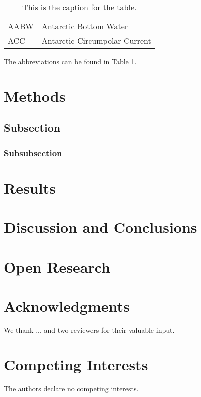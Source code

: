 \documentclass{agujournal2019}
\begin{document}
\begin{table}
 \caption{This is the caption for the table.}
 \centering
 \begin{tabular}{l l}
 \hline
    AABW	& Antarctic Bottom Water\\
    ACC		& Antarctic Circumpolar Current\\
 \hline
\end{tabular}
\label{tab:abbreviations}
\end{table}
The abbreviations can be found in Table \ref{tab:abbreviations}.

\section{Methods} 
\subsection{Subsection}
\subsubsection{Subsubsection}
\section{Results}
\section{Discussion and Conclusions}
\section{Open Research} 
\section{Acknowledgments} We thank ... and two reviewers for their valuable input.
\section{Competing Interests} The authors declare no competing interests.

\pagebreak
\end{document}
